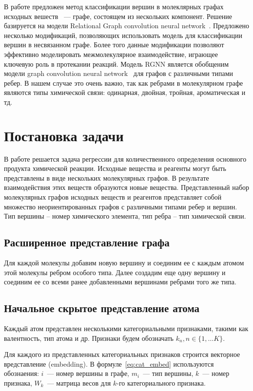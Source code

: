 \documentclass[12pt, twoside]{article}
\begin{document}
В работе предложен метод классификации вершин в молеклярных графах исходных вешеств ~--- графе, состоящем из нескольких компонент. Решение базируется на модели Relational Graph convolution neural network~\cite{schlichtkrull2018modeling}. Предложено несколько модификаций, позволяющих использовать модель для классификации вершин в несвязанном графе. Более того данные модификации позволяют эффективно моделировать межмолекулярное взаимодействие, играющее ключевую роль в протекании реакций. Модель RGNN является обобщеним модели graph convolution neural network~\cite{kipf2016semi} для графов с различными типами ребер. В нашем случае это очень важно, так как ребрами в молекулярном графе являются типы химической связи: одинарная, двойная, тройная, ароматическая и тд. 


\section{Постановка задачи}
 
 В работе решается задача регрессии для количественного определения основного продукта химической реакции. Исходные вещества и реагенты могут быть представлены в виде нескольких молекулярных графов. В результате взаимодействия этих веществ образуются новые вещества. Представленный набор молекулярных графов исходных веществ и реагентов представляет собой множество неориентированных графов с различными типами ребер и вершин. Тип вершины -- номер химического элемента, тип ребра -- тип химической связи.
 

 
 \subsection{Расширенное представление графа}
 
 Для каждой молекулы добавим новую вершину и соединим ее с каждым атомом этой молекулы ребром особого типа. Далее создадим еще одну вершину и соединим ее со всеми ранее добавленными вершинами ребрами того же типа. 
 
 \subsection{Начальное скрытое представление атома}
 
 Каждый атом представлен несколькими категориальными признаками, такими как валентность, тип атома и др. Признаки будем обозначать $k_n, n \in \{1, \ldots K\}$.
 
 Для каждого из представленных категориальных признаков строится векторное вредставление (embedding). В формуле~\eqref{eq:cat_embed} используются обознаения: $i$~--- номер вершины в графе, $m_i$~--- тип вершины, $k$~--- номер признака, $W_k$~--- матрица весов для $k$-го категориального признака.
\end{document}
